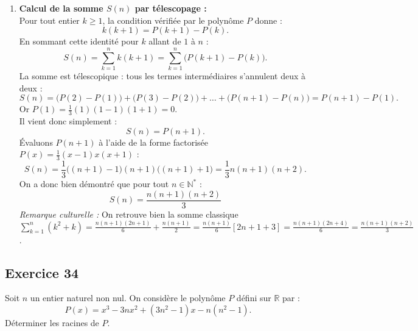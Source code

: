 \documentclass[11pt,a4paper]{article}
\begin{document}
\begin{correctionbox}
\begin{enumerate}
    \item \textbf{Calcul de la somme $S(n)$ par télescopage :}\\
    Pour tout entier $k \ge 1$, la condition vérifiée par le polynôme $P$ donne :
    \[
    k(k+1) = P(k+1) - P(k).
    \]
    En sommant cette identité pour $k$ allant de $1$ à $n$ :
    \[
    S(n) = \sum_{k=1}^n k(k+1) = \sum_{k=1}^n \bigl( P(k+1) - P(k) \bigr).
    \]
    La somme est télescopique : tous les termes intermédiaires s'annulent deux à deux :
    \[
    S(n) = \bigl( P(2) - P(1) \bigr) + \bigl( P(3) - P(2) \bigr) + \dots + \bigl( P(n+1) - P(n) \bigr) = P(n+1) - P(1).
    \]
    Or $P(1) = \frac{1}{3}(1)(1-1)(1+1) = 0$.\\
    Il vient donc simplement :
    \[
    S(n) = P(n+1).
    \]
    Évaluons $P(n+1)$ à l'aide de la forme factorisée $P(x) = \frac{1}{3}(x-1)x(x+1)$ :
    \[
    S(n) = \frac{1}{3}\bigl((n+1) - 1\bigr)(n+1)\bigl((n+1) + 1\bigr) = \frac{1}{3}n(n+1)(n+2).
    \]
    On a donc bien démontré que pour tout $n \in \mathbb{N}^*$ :
    \[
    \boxed{S(n) = \frac{n(n+1)(n+2)}{3}}
    \]
    \textit{Remarque culturelle :} On retrouve bien la somme classique $\sum_{k=1}^n (k^2+k) = \frac{n(n+1)(2n+1)}{6} + \frac{n(n+1)}{2} = \frac{n(n+1)}{6}[2n+1+3] = \frac{n(n+1)(2n+4)}{6} = \frac{n(n+1)(n+2)}{3}$.
\end{enumerate}
\end{correctionbox}

\subsection*{Exercice 34}
Soit $n$ un entier naturel non nul. On considère le polynôme $P$ défini sur $\mathbb{R}$ par :
\[
P(x) = x^3 - 3nx^2 + (3n^2 - 1)x - n(n^2 - 1).
\]
Déterminer les racines de $P$.
\end{document}
